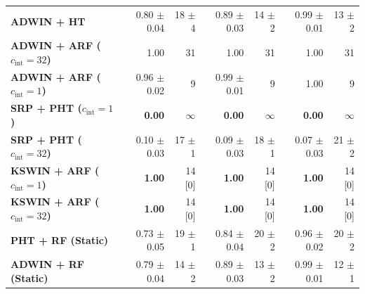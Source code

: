 \begin{table}[t]
\begin{tabular}{@{}lrrrrrr@{}}
    \midrule
    \textbf{ADWIN + HT}                            & 0.80 {\small $\pm$0.04} & 18 {\small $\pm$4} & 0.89 {\small $\pm$0.03} & 14 {\small $\pm$2} & 0.99 {\small $\pm$0.01} & 13 {\small $\pm$2} \\
    \textbf{ADWIN + ARF ($c_{\mathrm{int}} = 32$)} & 1.00 & 31 & 1.00 & 31 & 1.00 & 31 \\
    \textbf{ADWIN + ARF ($c_{\mathrm{int}} = 1$)}  & 0.96 {\small $\pm$0.02} & 9 & 0.99 {\small $\pm$0.01} & 9 & 1.00 & 9 \\
    \midrule
    \textbf{SRP + PHT ($c_{\mathrm{int}} = 1$)}    & \textbf{0.00} & $\infty$ & \textbf{0.00} & $\infty$ & \textbf{0.00} & $\infty$ \\
    \textbf{SRP + PHT ($c_{\mathrm{int}} = 32$)}   & 0.10 {\small $\pm$0.03} & 17 {\small $\pm$1} & 0.09 {\small $\pm$0.03} & 18 {\small $\pm$1} & 0.07 {\small $\pm$0.03} & 21 {\small $\pm$2} \\
    \textbf{KSWIN + ARF ($c_{\mathrm{int}} = 1$)}  & \textbf{1.00} & 14 [0] & \textbf{1.00} & 14 [0] & \textbf{1.00} & 14 [0] \\
    \textbf{KSWIN + ARF ($c_{\mathrm{int}} = 32$)} & \textbf{1.00} & 14 [0] & \textbf{1.00} & 14 [0] & \textbf{1.00} & 14 [0] \\
    \midrule
    \textbf{PHT + RF (Static)}                     & 0.73 {\small $\pm$0.05} & 19 {\small $\pm$1} & 0.84 {\small $\pm$0.04} & 20 {\small $\pm$2} & 0.96 {\small $\pm$0.02} & 20 {\small $\pm$2} \\
    \textbf{ADWIN + RF (Static)}                   & 0.79 {\small $\pm$0.04} & 14 {\small $\pm$2} & 0.89 {\small $\pm$0.03} & 13 {\small $\pm$2} & 0.99 {\small $\pm$0.01} & 12 {\small $\pm$1} \\
    \bottomrule
  \end{tabular}
\end{table}
